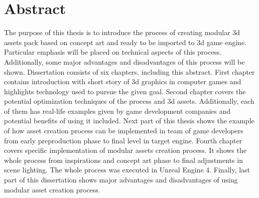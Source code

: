 
\chapter*{Abstract}

The purpose of this thesis is to introduce the process of creating modular 3d assets pack based on concept art and ready to be imported to 3d game engine. Particular emphasis will be placed on technical aspects of this process. Additionally, some major advantages and disadvantages of this process will be shown. \newline
Dissertation consists of six chapters, including this abstract.\newline\indent
First chapter contains introduction with short story of 3d graphics in computer games and highlights technology used to pursue the given goal.\newline\indent
Second chapter covers the potential optimization techniques of the process and 3d assets. Additionally, each of them has real-life examples given by game development companies and potential benefits of using it included. \newline\indent
Next part of this thesis shows the example of how asset creation process can be implemented in team of game developers from early preproduction phase to final level in target engine. \newline\indent
Fourth chapter covers specific implementation of modular assets creation process. It shows the whole process from inspirations and concept art phase to final adjustments in scene lighting. The whole process was executed in Unreal Engine 4. \newline\indent
Finally, last part of this dissertation shows major advantages and disadvantages of using modular asset creation process. 